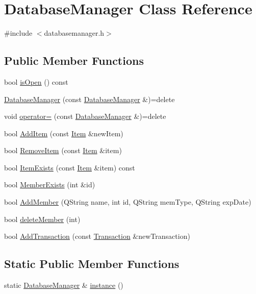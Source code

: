 \hypertarget{class_database_manager}{}\section{Database\+Manager Class Reference}
\label{class_database_manager}


{\ttfamily \#include $<$databasemanager.\+h$>$}

\subsection*{Public Member Functions}
\begin{DoxyCompactItemize}
\item 
bool \hyperlink{class_database_manager_af1c0598acf843b8e970053f17fc845f1}{is\+Open} () const
\item 
\hyperlink{class_database_manager_aefa3d6eae7782904f5d758462b573b1e}{Database\+Manager} (const \hyperlink{class_database_manager}{Database\+Manager} \&)=delete
\item 
void \hyperlink{class_database_manager_acf8defd44bb315a62c6ef9ed10ea52c0}{operator=} (const \hyperlink{class_database_manager}{Database\+Manager} \&)=delete
\item 
bool \hyperlink{class_database_manager_a1b647f6b2904740102c6b00ab72c5843}{Add\+Item} (const \hyperlink{class_item}{Item} \&new\+Item)
\item 
bool \hyperlink{class_database_manager_a13822fb9377f14b4aa1bfaf602b1498c}{Remove\+Item} (const \hyperlink{class_item}{Item} \&item)
\item 
bool \hyperlink{class_database_manager_ac801dc5402aed14ff310ba12a97f26fe}{Item\+Exists} (const \hyperlink{class_item}{Item} \&item) const
\item 
bool \hyperlink{class_database_manager_a6dfabfa6124ec355e8c74b2c14c79f90}{Member\+Exists} (int \&id)
\item 
bool \hyperlink{class_database_manager_add7d1cba7d8a7ad3e75f241d1195e7a3}{Add\+Member} (Q\+String name, int id, Q\+String mem\+Type, Q\+String exp\+Date)
\item 
bool \hyperlink{class_database_manager_afe3485d17fc80aef5533f76cea5c8a9e}{delete\+Member} (int)
\item 
bool \hyperlink{class_database_manager_a244dc8708ff2f3bd600deb85f3dca45a}{Add\+Transaction} (const \hyperlink{class_transaction}{Transaction} \&new\+Transaction)
\end{DoxyCompactItemize}
\subsection*{Static Public Member Functions}
\begin{DoxyCompactItemize}
\item 
static \hyperlink{class_database_manager}{Database\+Manager} \& \hyperlink{class_database_manager_a4abb527066e28f3928ef45af856e134c}{instance} ()
\end{DoxyCompactItemize}


